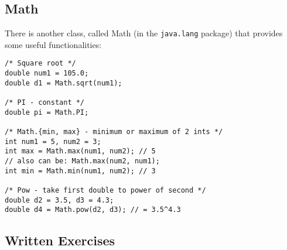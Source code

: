 \subsection{Math}
There is another class, called Math (in the \verb|java.lang| package) that provides some useful functionalities:
\begin{lstlisting}
/* Square root */
double num1 = 105.0;
double d1 = Math.sqrt(num1);

/* PI - constant */
double pi = Math.PI; 

/* Math.{min, max} - minimum or maximum of 2 ints */
int num1 = 5, num2 = 3;
int max = Math.max(num1, num2); // 5
// also can be: Math.max(num2, num1);
int min = Math.min(num1, num2); // 3

/* Pow - take first double to power of second */
double d2 = 3.5, d3 = 4.3;
double d4 = Math.pow(d2, d3); // = 3.5^4.3
\end{lstlisting}


\subsection{Written Exercises}


